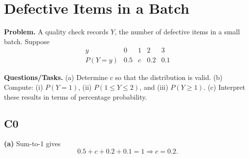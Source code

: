 		\section{Defective Items in a Batch}
		
		\textbf{Problem.}
		A quality check records $Y$, the number of defective items in a small batch. Suppose
		\[
		\begin{array}{c|cccc}
			y & 0 & 1 & 2 & 3\\
			\hline
			P(Y=y) & 0.5 & c & 0.2 & 0.1
		\end{array}
		\]
		
		\textbf{Questions/Tasks.}
		(a) Determine $c$ so that the distribution is valid.
		(b) Compute: (i) $P(Y=1)$, (ii) $P(1\le Y\le 2)$, and (iii) $P(Y\ge 1)$.
		(c) Interpret these results in terms of percentage probability.
		
		\subsection*{C0}

		\textbf{(a)} Sum-to-1 gives
		\[
		0.5+c+0.2+0.1=1\Rightarrow c=0.2.
		\]

